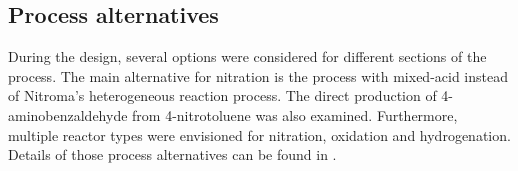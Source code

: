 \subsection{Process alternatives}
During the design, several options were considered for different sections of the process. The main alternative for nitration is the process with mixed-acid instead of Nitroma's heterogeneous reaction process. The direct production of 4-aminobenzaldehyde from 4-nitrotoluene was also examined. Furthermore, multiple reactor types were envisioned for nitration, oxidation and hydrogenation. Details of those process alternatives can be found in .



